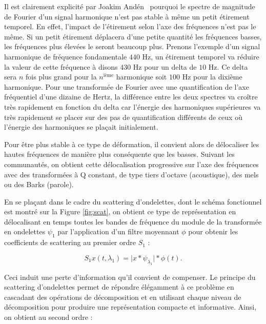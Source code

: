 Il est clairement explicité par Joakim And\'en~\cite{anden2014deep} pourquoi le spectre de magnitude de Fourier d'un signal harmonique n'est pas stable à même un petit étirement temporel. En effet, l'impact de l'étirement selon l'axe des fréquences n'est pas le même. Si un petit étirement déplacera d'une petite quantité les fréquences basses, les fréquences plus élevées le seront beaucoup plus. Prenons l'exemple d'un signal harmonique de fréquence fondamentale $440$ Hz, un étirement temporel va réduire la valeur de cette fréquence à disons $430$ Hz pour un delta de $10$ Hz. Ce delta sera $n$ fois plus grand pour la $n^{\text{ième}}$ harmonique soit $100$ Hz pour la dixième harmonique. Pour une transformée de Fourier avec une quantification de l'axe fréquentiel d'une dizaine de Hertz, la différence entre les deux spectres va croître très rapidement en fonction du delta car l'énergie des harmoniques supérieures va très rapidement se placer sur des pas de quantification différents de ceux où l'énergie des harmoniques se plaçait initialement.

Pour être plus stable à ce type de déformation, il convient alors de \og délocaliser \fg les hautes fréquences de manière plus conséquente que les basses. Suivant les communautés, on obtient cette délocalisation progressive sur l'axe des fréquences avec des transformées à Q constant, de type tiers d'octave (acoustique), des mels ou des Barks (parole).

En se plaçant dans le cadre du scattering d'ondelettes, dont le schéma fonctionnel est montré sur la Figure \ref{fig:scat}, on obtient ce type de représentation en délocalisant en temps toutes les bandes de fréquence du module de la transformée en ondelettes $\psi_1$ par l'application d'un filtre moyennant $\phi$ pour obtenir les coefficients de scattering au premier ordre $S_1$ :

\begin{equation}
S_1{x}(t, \lambda_1)
= \vert {x} \ast {\psi_{\lambda_1}} \vert \ast \phi(t)\mbox{.}
\end{equation}

Ceci induit une perte d'information qu'il convient de compenser. Le principe du scattering d'ondelettes permet de répondre élégamment à ce problème en cascadant des opérations de décomposition et en utilisant chaque niveau de décomposition pour produire une représentation compacte et informative. Ainsi, on obtient au second ordre :

